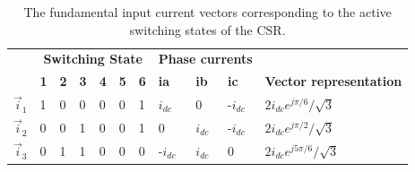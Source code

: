 
\begin{table}[]
\caption{The fundamental input current vectors corresponding to the active switching states of the CSR.}
    \begin{tabular}{|l|l|l|l|l|l|l|l|l|l|l|}
    \hline
    \rowcolor[HTML]{EFEFEF}
    \multicolumn{1}{|c|}{\cellcolor[HTML]{EFEFEF}}                                & \multicolumn{6}{c|}{\cellcolor[HTML]{EFEFEF}\textbf{Switching State}}       & \multicolumn{3}{l|}{\cellcolor[HTML]{EFEFEF}\textbf{Phase currents}} & \multicolumn{1}{c|}{\cellcolor[HTML]{EFEFEF}}                                                 \\ \cline{2-10}
    \rowcolor[HTML]{EFEFEF}
    \multicolumn{1}{|c|}{\multirow{-2}{*}{\cellcolor[HTML]{EFEFEF}\textbf{Name}}} & \textbf{1} & \textbf{2} & \textbf{3} & \textbf{4} & \textbf{5} & \textbf{6} & \textbf{ia}           & \textbf{ib}           & \textbf{ic}          & \multicolumn{1}{c|}{\multirow{-2}{*}{\cellcolor[HTML]{EFEFEF}\textbf{Vector representation}}} \\ \hline
    $\vec{i}_1$                                                                           & 1          & 0          & 0          & 0          & 0          & 1          & $i_{dc}$                   & 0                     & -$i_{dc}$                 & $2i_{dc}e^{j\pi/6}/\sqrt{3}$                                                                                           \\ \hline
    $\vec{i}_2$                                                                            & 0          & 0          & 1          & 0          & 0          & 1          & 0                     & $i_{dc}$                   & -$i_{dc}$                 & $2i_{dc}e^{j\pi/2}/\sqrt{3}$                                                                                           \\ \hline
    $\vec{i}_3$                                                                            & 0          & 1          & 1          & 0          & 0          & 0          & -$i_{dc}$                  & $i_{dc}$                   & 0                    & $2i_{dc}e^{j5\pi/6}/\sqrt{3}$                                                                                          \\ \hline

\end{tabular}
\end{table}
